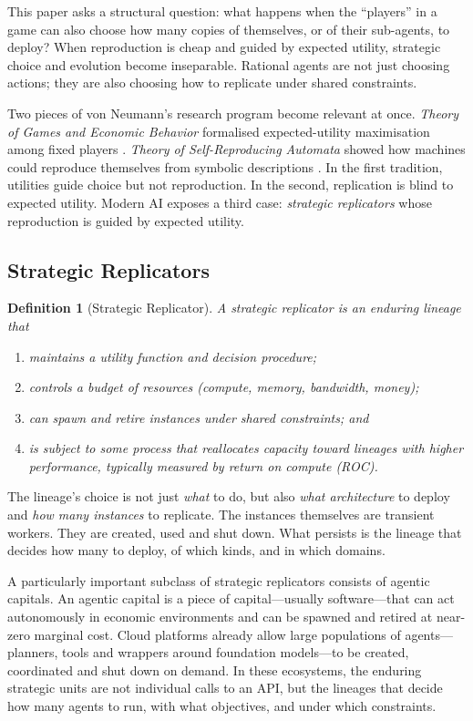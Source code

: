 \documentclass[12pt]{article}
\newtheorem{definition}[theorem]{Definition}
\begin{document}
This paper asks a structural question: what happens when the ``players'' in a game can also choose how many copies of themselves, or of their sub-agents, to deploy? When reproduction is cheap and guided by expected utility, strategic choice and evolution become inseparable. Rational agents are not just choosing actions; they are also choosing how to replicate under shared constraints.

Two pieces of von Neumann's research program become relevant at once. \emph{Theory of Games and Economic Behavior} formalised expected-utility maximisation among fixed players \citep{vonneumann1944}. \emph{Theory of Self-Reproducing Automata} showed how machines could reproduce themselves from symbolic descriptions \citep{vonneumann1966}. In the first tradition, utilities guide choice but not reproduction. In the second, replication is blind to expected utility. Modern AI exposes a third case: \emph{strategic replicators} whose reproduction is guided by expected utility.

\subsection{Strategic Replicators}

\begin{definition}[Strategic Replicator]
\label{def:strategic-replicator}
A \emph{strategic replicator} is an enduring lineage that
\begin{enumerate}
    \item maintains a utility function and decision procedure;
    \item controls a budget of resources (compute, memory, bandwidth, money);
    \item can spawn and retire instances under shared constraints; and
    \item is subject to some process that reallocates capacity toward lineages with higher performance, typically measured by return on compute (ROC).
\end{enumerate}
\end{definition}

The lineage's choice is not just \emph{what} to do, but also \emph{what architecture} to deploy and \emph{how many instances} to replicate. The instances themselves are transient workers. They are created, used and shut down. What persists is the lineage that decides how many to deploy, of which kinds, and in which domains.

A particularly important subclass of strategic replicators consists of agentic capitals. An agentic capital is a piece of capital---usually software---that can act autonomously in economic environments and can be spawned and retired at near-zero marginal cost. Cloud platforms already allow large populations of agents---planners, tools and wrappers around foundation models---to be created, coordinated and shut down on demand. In these ecosystems, the enduring strategic units are not individual calls to an API, but the lineages that decide how many agents to run, with what objectives, and under which constraints.
\end{document}
